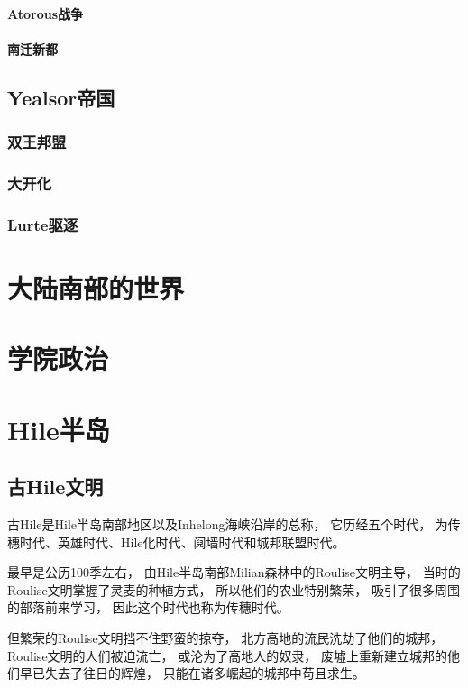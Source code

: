 \documentclass[UTF8,12pt,draft]{ctexbook}
\begin{document}
                \subsubsection{Atorous战争}
                \subsubsection{南迁新都}

        \section{Yealsor帝国}
            \subsection{双王邦盟}
            \subsection{大开化}
            \subsection{Lurte驱逐}
    \chapter{大陆南部的世界}
    \chapter{学院政治}
    \chapter{Hile半岛}
        \section{古Hile文明}
        古Hile是Hile半岛南部地区以及Inhelong海峡沿岸的总称，
        它历经五个时代，
        为传穗时代、英雄时代、Hile化时代、阋墙时代和城邦联盟时代。

        最早是公历100季左右，
        由Hile半岛南部Milian森林中的Roulise文明主导，
        当时的Roulise文明掌握了灵麦的种植方式，
        所以他们的农业特别繁荣，
        吸引了很多周围的部落前来学习，
        因此这个时代也称为传穗时代。

        但繁荣的Roulise文明挡不住野蛮的掠夺，
        北方高地的流民洗劫了他们的城邦，
        Roulise文明的人们被迫流亡，
        或沦为了高地人的奴隶，
        废墟上重新建立城邦的他们早已失去了往日的辉煌，
        只能在诸多崛起的城邦中苟且求生。
\end{document}
